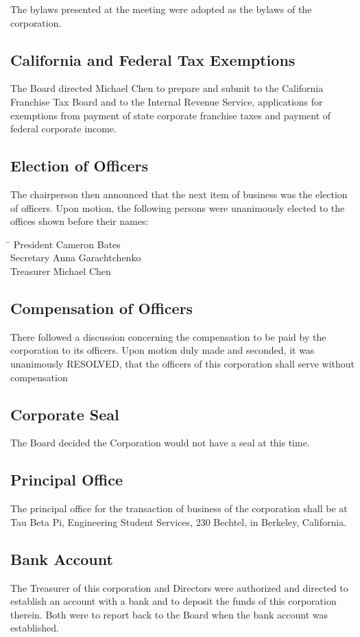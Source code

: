 \documentclass{article}
\begin{document}
	The bylaws presented at the meeting were adopted as the bylaws of the corporation.
	
	\subsection*{California and Federal Tax Exemptions}
	The Board directed Michael Chen to prepare and submit to the California Franchise Tax Board and to the Internal Revenue Service, applications for exemptions from payment of state corporate franchise taxes and payment of federal corporate income.
	\subsection*{Election of Officers}
	The chairperson then announced that the next item of business was the election of officers. Upon motion, the following persons were unanimously elected to the offices shown before their names:
	\begin{tabbing}
		{\hskip 1in} \= \kill
		President\>	Cameron Bates \\
		Secretary \> Anna Garachtchenko \\
		Treasurer \> Michael Chen 
	\end{tabbing}
	\subsection*{Compensation of Officers}
	There followed a discussion concerning the compensation to be paid by the corporation to its officers. Upon motion duly made and seconded, it was unanimously RESOLVED, that the officers of this corporation shall serve without compensation
	\subsection*{Corporate Seal}
	The Board decided the Corporation would not have a seal at this time.
	\subsection*{Principal Office}
	The principal office for the transaction of business of the corporation shall be at Tau Beta Pi, Engineering Student Services, 230 Bechtel, in Berkeley, California.
	
	\subsection*{Bank Account}
	The Treasurer of this corporation and Directors were authorized and directed to establish an account with a bank and to deposit the funds of this corporation therein. Both were to report back to the Board when the bank account was established.
	
\end{document}
